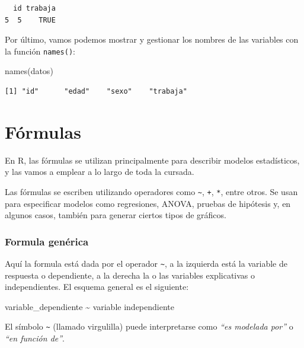 \documentclass[
  spanish,
  letterpaper,
  DIV=11,
  numbers=noendperiod]{scrreprt}
\newenvironment{Shaded}{\begin{snugshade}}{\end{snugshade}}
\newcommand{\FunctionTok}[1]{\textcolor[rgb]{0.28,0.35,0.67}{#1}}
\newcommand{\NormalTok}[1]{\textcolor[rgb]{0.00,0.23,0.31}{#1}}
\newcommand{\SpecialCharTok}[1]{\textcolor[rgb]{0.37,0.37,0.37}{#1}}
\begin{document}
\begin{verbatim}
  id trabaja
5  5    TRUE
\end{verbatim}

Por último, vamos podemos mostrar y gestionar los nombres de las
variables con la función \texttt{names()}:

\begin{Shaded}
\begin{Highlighting}[]
\FunctionTok{names}\NormalTok{(datos)}
\end{Highlighting}
\end{Shaded}

\begin{verbatim}
[1] "id"      "edad"    "sexo"    "trabaja"
\end{verbatim}

\section{Fórmulas}\label{fuxf3rmulas}

En R, las fórmulas se utilizan principalmente para describir modelos
estadísticos, y las vamos a emplear a lo largo de toda la cursada.

Las fórmulas se escriben utilizando operadores como
\texttt{\textasciitilde{}}, \texttt{+}, \texttt{*}, entre otros. Se usan
para especificar modelos como regresiones, ANOVA, pruebas de hipótesis
y, en algunos casos, también para generar ciertos tipos de gráficos.

\subsubsection{Formula genérica}\label{formula-genuxe9rica}

Aquí la formula está dada por el operador \texttt{\textasciitilde{}}, a
la izquierda está la variable de respuesta o dependiente, a la derecha
la o las variables explicativas o independientes. El esquema general es
el siguiente:

\begin{Shaded}
\begin{Highlighting}[]
\NormalTok{variable\_dependiente }\SpecialCharTok{\textasciitilde{}}\NormalTok{ variable}
\NormalTok{independiente}
\end{Highlighting}
\end{Shaded}

El símbolo \texttt{\textasciitilde{}} (llamado virgulilla) puede
interpretarse como \emph{``es modelada por''} o \emph{``en función
de''}.
\end{document}
